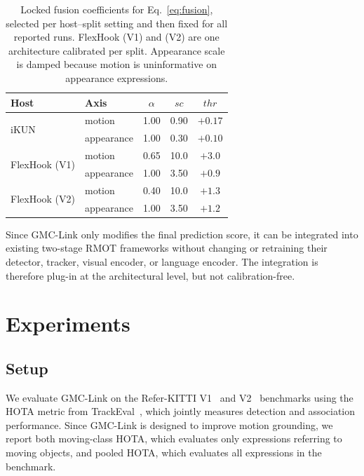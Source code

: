 \documentclass[sigconf,anonymous,nonacm]{acmart}
\begin{document}
\begin{table}[t]
\centering
\caption{Locked fusion coefficients for Eq.~\ref{eq:fusion}, selected per host--split setting and then fixed for all reported runs. FlexHook (V1) and (V2) are one architecture calibrated per split. Appearance scale is damped because motion is uninformative on appearance expressions.}
\label{tab:recipe}
\small
\begin{tabular}{llccc}
\toprule
Host & Axis & $\alpha$ & $\mathit{sc}$ & $\mathit{thr}$ \\
\midrule
\multirow{2}{*}{iKUN}        & motion     & 1.00 & 0.90 & $+0.17$ \\
                             & appearance & 1.00 & 0.30 & $+0.10$ \\
\midrule
\multirow{2}{*}{FlexHook (V1)} & motion     & 0.65 & 10.0 & $+3.0$  \\
                             & appearance & 1.00 & 3.50 & $+0.9$  \\
\midrule
\multirow{2}{*}{FlexHook (V2)} & motion     & 0.40 & 10.0 & $+1.3$  \\
                             & appearance & 1.00 & 3.50 & $+1.2$  \\
\bottomrule
\end{tabular}
\end{table}

Since GMC-Link only modifies the final prediction score, it can be integrated into existing two-stage RMOT frameworks without changing or retraining their detector, tracker, visual encoder, or language encoder. The integration is therefore plug-in at the architectural level, but not calibration-free.

\section{Experiments}
\label{sec:exp}

\subsection{Setup}
\label{sec:setup}

We evaluate GMC-Link on the Refer-KITTI V1~\cite{transrmot} and V2~\cite{temprmot} benchmarks using the HOTA metric from TrackEval~\cite{hota}, which jointly measures detection and association performance. Since GMC-Link is designed to improve motion grounding, we report both moving-class HOTA, which evaluates only expressions referring to moving objects, and pooled HOTA, which evaluates all expressions in the benchmark.
\end{document}
